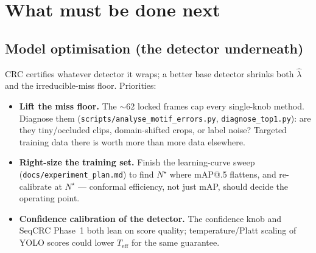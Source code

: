 \documentclass[11pt,a4paper]{article}
\newcommand{\lamhat}{\hat{\lambda}}
\newcommand{\code}[1]{\texttt{\small #1}}
\begin{document}
\section{What must be done next}
\subsection{Model optimisation (the detector underneath)}
CRC certifies whatever detector it wraps; a better base detector shrinks both
$\lamhat$ and the irreducible-miss floor. Priorities:
\begin{itemize}[nosep]
  \item \textbf{Lift the miss floor.} The $\sim$62 locked frames cap every
    single-knob method. Diagnose them (\code{scripts/analyse\_motif\_errors.py},
    \code{diagnose\_top1.py}): are they tiny/occluded clips, domain-shifted
    crops, or label noise? Targeted training data there is worth more than more
    data elsewhere.
  \item \textbf{Right-size the training set.} Finish the learning-curve sweep
    (\code{docs/experiment\_plan.md}) to find $N^\star$ where mAP@.5 flattens,
    and re-calibrate at $N^\star$ --- conformal efficiency, not just mAP, should
    decide the operating point.
  \item \textbf{Confidence calibration of the detector.} The confidence knob and
    SeqCRC Phase~1 both lean on score quality; temperature/Platt scaling of YOLO
    scores could lower $T_{\text{eff}}$ for the same guarantee.
\end{itemize}
\end{document}
